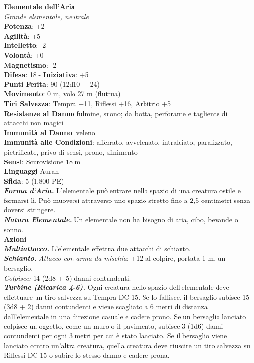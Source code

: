 \begin{multicols}{2}
\medskip\textbf{Elementale dell'Aria}\\
\emph{Grande elementale, neutrale}\\
\textbf{Potenza}: +2\\
\textbf{Agilità}: +5\\
\textbf{Intelletto}: -2\\
\textbf{Volontà}: +0\\
\textbf{Magnetismo}: -2\\
\textbf{Difesa}: 18 - \textbf{Iniziativa}: +5\\
\textbf{Punti Ferita}: 90 (12d10 + 24)\\
\textbf{Movimento}: 0 m, volo 27 m (fluttua)\\
\textbf{Tiri Salvezza}: Tempra +11, Riflessi +16, Arbitrio +5\\
\textbf{Resistenze al Danno} fulmine, suono; da botta, perforante e tagliente di attacchi non magici\\
\textbf{Immunità al Danno}: veleno\\
\textbf{Immunità alle Condizioni}: afferrato, avvelenato, intralciato, paralizzato, pietrificato, privo di sensi, prono, sfinimento\\
\textbf{Sensi}: Scurovisione 18 m\\
\textbf{Linguaggi} Auran\\
\textbf{Sfida}: 5 (1.800 PE)\smallskip\\
\emph{\textbf{Forma d'Aria.}} L'elementale può entrare nello spazio di una creatura ostile e fermarsi lì. Può muoversi attraverso uno spazio stretto fino a 2,5 centimetri senza doversi stringere.\\
\emph{\textbf{Natura Elementale.}} Un elementale non ha bisogno di aria, cibo, bevande o sonno.\\
\smallskip\textbf{Azioni}\\
\emph{\textbf{Multiattacco.}} L'elementale effettua due attacchi di schianto.\\
\emph{\textbf{Schianto.} Attacco con arma da mischia}: +12 al colpire, portata 1 m, un bersaglio.\\
\emph{Colpisce:} 14 (2d8 + 5) danni contundenti.\\
\emph{\textbf{Turbine (Ricarica 4-6).}} Ogni creatura nello spazio dell'elementale deve effettuare un tiro salvezza su Tempra DC  15. Se lo fallisce, il bersaglio subisce 15 (3d8 + 2) danni contundenti e viene scagliato a 6 metri di distanza dall'elementale in una direzione casuale e cadere prono. Se un bersaglio lanciato colpisce un oggetto, come un muro o il pavimento, subisce 3 (1d6) danni contundenti per ogni 3 metri per cui è stato lanciato. Se il bersaglio viene lanciato contro un'altra creatura, quella creatura deve riuscire un tiro salvezza su Riflessi DC  15 o subire lo stesso danno e cadere prona.\\

\end{multicols}
